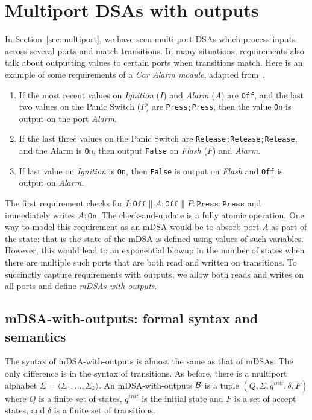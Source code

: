 \section{Multiport DSAs with outputs}
\label{sec:multiport-outputs}

In Section~\ref{sec:multiport}, we have seen multi-port DSAs which process inputs across several ports and match transitions. In many situations, requirements also talk about outputting values to certain ports when transitions match. Here is an example of some requirements of a \emph{Car Alarm module}, adapted from~\cite{DBLP:conf/enase/VenkateshSZA15a}. 
\begin{enumerate}
\item If the most recent values on \emph{Ignition} ($I$) and \emph{Alarm} ($A$) are \texttt{Off}, and the last two values on the Panic Switch ($P$) are \texttt{Press;Press}, then the value \texttt{On} is output on the port \emph{Alarm}.

\item If the last three values on the Panic Switch are \texttt{Release;Release;Release}, and the Alarm is \texttt{On}, then output \texttt{False} on \emph{Flash} ($F$)
and \emph{Alarm}.

\item If last value on \emph{Ignition} is \texttt{On}, then \texttt{False} is output on \emph{Flash} and \texttt{Off} is output on \emph{Alarm}.
\end{enumerate}

The first requirement checks for $I:\mathtt{Off} \parallel A:\mathtt{Off} \parallel P:\mathtt{Press;Press}$ and immediately writes $A: \mathtt{On}$. The check-and-update is a fully atomic operation. One way to model this requirement as an mDSA would be to absorb port $A$ as part of the state: that is the state of the mDSA is defined using values of such variables. However, this would lead to an exponential blowup in the number of states when there are multiple such ports that are both read and written on transitions. To succinctly capture requirements with outputs, we allow both reads and writes on all ports and define \emph{mDSAs with outputs}. 

\subsection{mDSA-with-outputs: formal syntax and semantics}

The syntax of mDSA-with-outputs is almost the same as that of mDSAs. The only difference is in the syntax of transitions.  As before, there is a multiport alphabet $\Sigma = \langle \Sigma_1, \dots, \Sigma_k \rangle$. An mDSA-with-outputs $\mathcal{B}$ is a tuple $(Q, \Sigma, q^{init}, \delta, F)$ where $Q$ is a finite set of states, $q^{init}$ is the initial state and $F$ is a set of accept states, and $\delta$ is a finite set of transitions.

